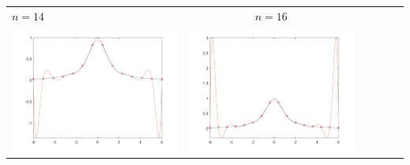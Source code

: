 \small\begin{tabular}{l*{5}{c}}
\hspace{3.5cm}\(n=14\) &  \(n=16\) \\
\includegraphics[scale=0.5]{cap4/4_9/14.png} &  \includegraphics[scale=0.5]{cap4/4_9/16.png} \\


\end{tabular}

